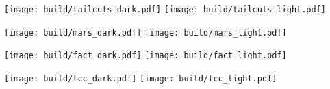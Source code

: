 \begin{frame}
    {%
    \centering
    \texttt{[image: build/tailcuts\_dark.pdf]}
    }
    {%
    \centering
    \texttt{[image: build/tailcuts\_light.pdf]}
    }
\end{frame}

\begin{frame}
    {%
    \centering
    \texttt{[image: build/mars\_dark.pdf]}
    }
    {%
    \centering
    \texttt{[image: build/mars\_light.pdf]}
    }
\end{frame}

\begin{frame}
    {%
    \centering
    \texttt{[image: build/fact\_dark.pdf]}
    }
    {%
    \centering
    \texttt{[image: build/fact\_light.pdf]}
    }
\end{frame}

\begin{frame}
    {%
    \centering
    \texttt{[image: build/tcc\_dark.pdf]}
    }
    {%
    \centering
    \texttt{[image: build/tcc\_light.pdf]}
    }
\end{frame}

